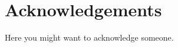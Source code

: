 \documentclass[11pt,a4paper]{article}
\begin{document}
\section*{Acknowledgements}
Here you might want to acknowledge someone.

\end{document}
